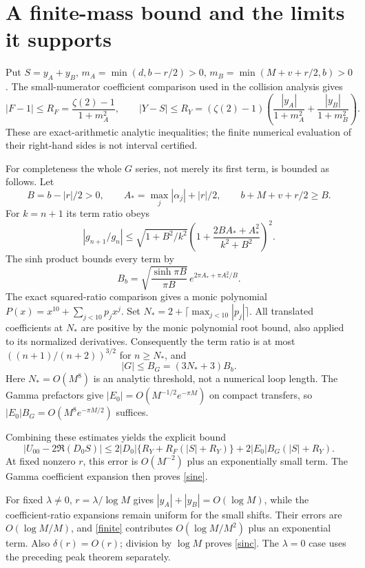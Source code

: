 \documentclass[11pt,a4paper]{article}
\begin{document}
\newpage
\section{A finite-mass bound and the limits it supports}
Put $S=y_A+y_B$, $m_A=\min(d,b-r/2)>0$,
$m_B=\min(M+v+r/2,b)>0$. The small-numerator coefficient
comparison used in the collision analysis gives
\[
 |F-1|\le R_F=\frac{\zeta(2)-1}{1+m_A^2},\qquad
 |Y-S|\le R_Y=(\zeta(2)-1)
 \left(\frac{|y_A|}{1+m_A^2}+\frac{|y_B|}{1+m_B^2}\right).
\]
These are exact-arithmetic analytic inequalities; the finite numerical
evaluation of their right-hand sides is not interval certified.

For completeness the whole $G$ series, not merely its first term,
is bounded as follows. Let
\[
 B=b-|r|/2>0,\qquad A_*=\max_j|\alpha_j|+|r|/2,
 \qquad b+M+v+r/2\ge B .
\]
For $k=n+1$ its term ratio obeys
\[
 |g_{n+1}/g_n|\le
 \sqrt{1+B^2/k^2}
 \left(1+\frac{2BA_*+A_*^2}{k^2+B^2}\right)^2.
\]
The sinh product \cite{product} bounds every term by
\[
 B_b=\sqrt{\frac{\sinh\pi B}{\pi B}}\,
       e^{2\pi A_*+\pi A_*^2/B}.
\]
The exact squared-ratio comparison gives a monic polynomial
$P(x)=x^{10}+\sum_{j<10}p_jx^j$. Set
$N_*=2+\lceil\max_{j<10}|p_j|\rceil$.
All translated coefficients at $N_*$ are positive by the monic
polynomial root bound, also applied to its normalized derivatives.
Consequently the term ratio is at most
$((n+1)/(n+2))^{3/2}$ for $n\ge N_*$, and
\[
 |G|\le B_G=(3N_*+3)B_b .
\]
Here $N_*=O(M^8)$ is an analytic threshold, not a numerical loop length.
The Gamma prefactors give $|E_0|=O(M^{-1/2}e^{-\pi M})$ on
compact transfers, so $|E_0|B_G=O(M^8e^{-\pi M/2})$ suffices.

Combining these estimates yields the explicit bound
\begin{equation}
 \left|U_{00}-2\Re(D_0S)\right|
 \le 2|D_0|\{R_Y+R_F(|S|+R_Y)\}
       +2|E_0|B_G(|S|+R_Y).
 \label{finite}
\end{equation}
At fixed nonzero $r$, this error is $O(M^{-2})$ plus an exponentially
small term. The Gamma coefficient expansion then proves \eqref{sine}.

For fixed $\lambda\ne0$, $r=\lambda/\log M$ gives
$|y_A|+|y_B|=O(\log M)$, while the coefficient-ratio expansions
remain uniform for the small shifts. Their errors are
$O(\log M/M)$, and \eqref{finite} contributes
$O(\log M/M^2)$ plus an exponential term.
Also $\delta(r)=O(r)$; division by $\log M$ proves \eqref{sinc}.
The $\lambda=0$ case uses the preceding peak theorem separately.
\end{document}
